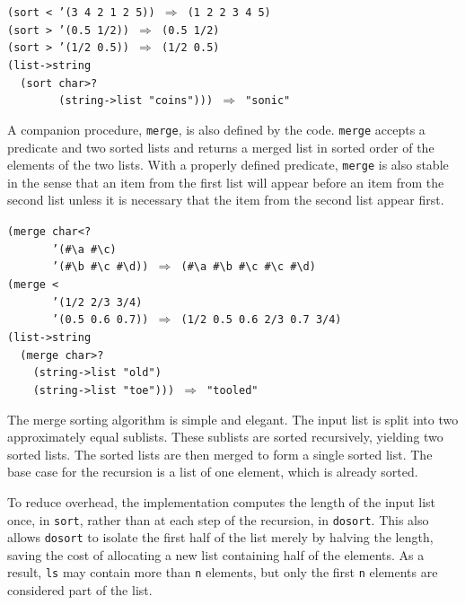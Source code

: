 \begin{alltt}
(sort \textless{} '(3 4 2 1 2 5)) \(\Rightarrow\) (1 2 2 3 4 5)
(sort \textgreater{} '(0.5 1/2)) \(\Rightarrow\) (0.5 1/2)
(sort \textgreater{} '(1/2 0.5)) \(\Rightarrow\) (1/2 0.5)
(list-\textgreater{}string
  (sort char\textgreater{}?
        (string-\textgreater{}list "coins"))) \(\Rightarrow\) "sonic"
\end{alltt}


A companion procedure, \label{examples_s11}\texttt{merge},
is also defined by the code.
\texttt{merge} accepts a predicate and two sorted lists and returns a
merged list in sorted order of the elements of the two lists.
With a properly defined predicate, \texttt{merge} is also stable in the
sense that an item from the first list will appear before an item
from the second list unless it is necessary that the item from
the second list appear first.



\begin{alltt}
(merge char\textless{}?
       '(\#{}\textbackslash{}a \#{}\textbackslash{}c)
       '(\#{}\textbackslash{}b \#{}\textbackslash{}c \#{}\textbackslash{}d)) \(\Rightarrow\) (\#{}\textbackslash{}a \#{}\textbackslash{}b \#{}\textbackslash{}c \#{}\textbackslash{}c \#{}\textbackslash{}d)
(merge \textless{}
       '(1/2 2/3 3/4)
       '(0.5 0.6 0.7)) \(\Rightarrow\) (1/2 0.5 0.6 2/3 0.7 3/4)
(list-\textgreater{}string
  (merge char\textgreater{}?
    (string-\textgreater{}list "old")
    (string-\textgreater{}list "toe"))) \(\Rightarrow\) "tooled"
\end{alltt}


The merge sorting algorithm is simple and elegant.
The input list is split into two approximately equal sublists.
These sublists are sorted recursively, yielding two sorted lists.
The sorted lists are then merged to form a single sorted list.
The base case for the recursion is a list of one element,
which is already sorted.


To reduce overhead, the implementation computes the length of the input
list once, in \texttt{sort}, rather than at each step of the recursion,
in \texttt{dosort}.
This also allows \texttt{dosort} to isolate the first half of the list
merely by halving the length, saving the cost of allocating a new list
containing half of the elements.
As a result, \texttt{ls} may contain more than \texttt{n} elements,
but only the first \texttt{n} elements are considered part of the list.


